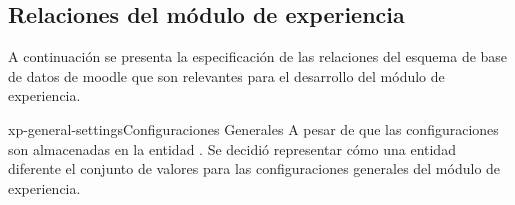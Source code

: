 
\subsection{Relaciones del módulo de experiencia}

 A continuación se presenta la especificación de las relaciones del esquema de base
 de datos de moodle que son relevantes para el desarrollo del módulo de experiencia.

    \begin{cdtEntidad}{xp-general-settings}{Configuraciones Generales}{
    A pesar de que las configuraciones son almacenadas en la entidad 
    . Se decidió representar cómo una entidad diferente 
    el conjunto de valores para las configuraciones generales del módulo de 
    experiencia.}


    \end{cdtEntidad}


